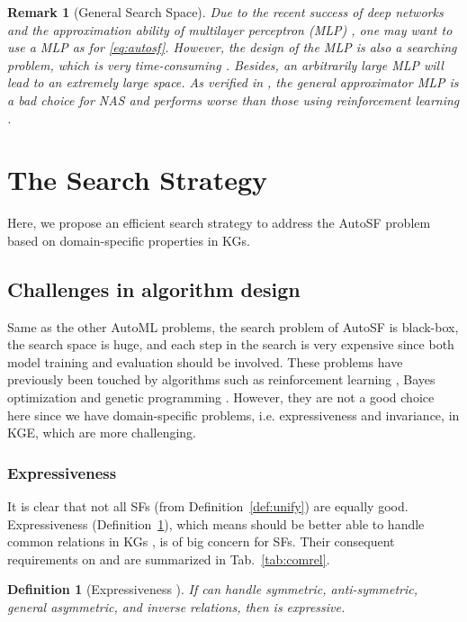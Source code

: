 \documentclass[conference]{IEEEtran}
\newtheorem{definition}{Definition}
\newtheorem{remark}{Remark}[section]
\begin{document}
{
\begin{remark}[General Search Space]
Due to the recent success of deep networks \cite{goodfellow2016deep}
and the approximation ability of multilayer perceptron (MLP) \cite{csaji2001approximation},
one may want to use a MLP as  for \eqref{eq:autosf}.
However,
the design of the MLP is also a searching problem,
which is 
very time-consuming \cite{zoph2017neural}.
Besides, an arbitrarily large MLP will lead to an extremely large space.
As verified in \cite{yao2019searching},
the general approximator MLP is a bad choice for NAS 
and performs worse than those using reinforcement learning \cite{zoph2017neural}.
\end{remark}
}

\section{The Search Strategy}
\label{sec:progred}
Here,
we propose an efficient search strategy to address the AutoSF problem
based on domain-specific properties in KGs.

\subsection{Challenges in algorithm design}
\label{ssec:challange}

Same as the other AutoML problems,
the search problem of AutoSF is black-box,
the search space is huge,
and each step in the search is very expensive since both model training and evaluation should be involved.
These problems have previously been touched by algorithms such as reinforcement learning \cite{zoph2017neural}, 
Bayes optimization \cite{feurer2015efficient}
and genetic programming \cite{xie2017genetic}.
However,
they are not a good choice here
since we have domain-specific problems,
i.e.  expressiveness and invariance,
 in KGE,
which are more challenging.

\subsubsection{Expressiveness}
\label{ssec:expre}

It is clear that
not all SFs  (from Definition~\ref{def:unify}) are equally good.
Expressiveness (Definition~\ref{def:exp}), 
which means  should be better able to handle common relations in KGs ,
is of big concern for SFs.
Their consequent requirements on  and  are summarized in Tab.~\ref{tab:comrel}.

\begin{definition}[Expressiveness \cite{trouillon2017knowledge,kazemi2018simple,wang2017multi}] \label{def:exp}
	If  can handle 
	symmetric,
	anti-symmetric,
	general asymmetric,
	and inverse relations,
	then  is expressive.
\end{definition}
\end{document}
